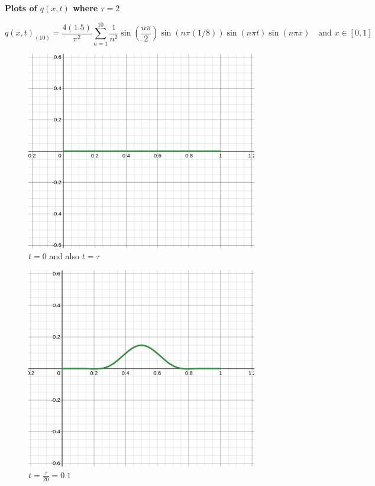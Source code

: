 \documentclass[letter]{article}
\begin{document}
\begin{center}
	{\huge \textbf{Plots of $q(x,t)$ where $\tau = 2$ }}
\end{center}
\[
\boxed{
q(x,t)_{(10)} = \frac{4 (1.5)}{\pi ^2} 
\sum_{n=1}^{10} \frac{1}{n^2}
\sin \left( \frac{n \pi }{2}\right) \sin \left({n \pi (1 / 8)}\right) 
\sin \left( n \pi t\right) \sin \left(n \pi x\right)
\quad \text{and } x \in [0,1]
}\]
\begin{minipage}{0.5\textwidth}
\begin{figure}[H]
	\centering
	\includegraphics[width=0.9\textwidth]{ss/d_n_03.png}
	\caption{$t = 0$ and also $t = \tau$}
	\label{fig:ss-c_n_001-png}
\end{figure}
\begin{figure}[H]
	\centering
	\includegraphics[width=0.9\textwidth]{ss/d_n_025.png}
	\caption{$t = \frac{\tau}{20} = 0.1 $}
	\label{fig:ss-c_n_01-png}
\end{figure}
\end{minipage}
\end{document}
